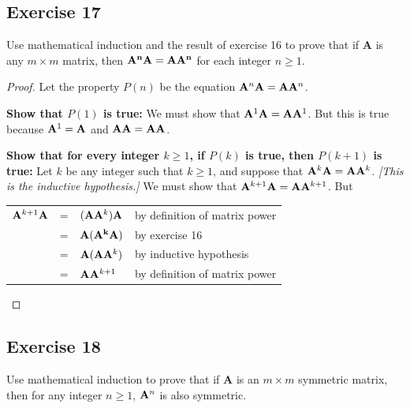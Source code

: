 \documentclass[14pt]{extarticle}
\newcommand{\cy}{\color{cyan}}
\begin{document}
\subsection{Exercise 17}
Use mathematical induction and the result of exercise 16 to prove that if {\bf A} is any \(m \times m\) matrix, then \({\bf A^n A = AA^n}\) for each integer \(n \geq 1\).

\begin{proof}
    Let the property \(P(n)\) be the equation \({\bf A}^n {\bf A} = {\bf A}{\bf A}^n\).

        {\bf Show that \(P(1)\) is true:} We must show that \({\bf A}^1{\bf A} = {\bf A}{\bf A}^1\). But this is true because
    \({\bf A}^1 = {\bf A}\) and \({\bf A}{\bf A} = {\bf A}{\bf A}\).

        {\bf Show that for every integer \(k \geq 1\), if \(P(k)\) is true, then \(P(k + 1)\) is true:} Let \(k\) be any integer
    such that \(k \geq 1\), and suppose that \({\bf A}^k{\bf A} = {\bf A}{\bf A}^k\). {\it [This is the inductive hypothesis.]}
    We must show that \({\bf A}^{k+1}{\bf A} = {\bf A}{\bf A}^{k+1}\). But
    \begin{center}
        \begin{tabular}{rcll}
            \({\bf A}^{k+1}{\bf A}\) & = & \(({\bf A}{\bf A}^k){\bf A}\) & {\cy by definition of matrix power} \\
                                     & = & \({\bf A}({\bf A^k}{\bf A})\) & {\cy by exercise 16}                \\
                                     & = & \({\bf A}({\bf A}{\bf A}^k)\) & {\cy by inductive hypothesis}       \\
                                     & = & \({\bf A}{\bf A}^{k+1}\)      & {\cy by definition of matrix power} \\
        \end{tabular}
    \end{center}
\end{proof}

\subsection{Exercise 18}
Use mathematical induction to prove that if {\bf A} is an \(m \times m\) symmetric matrix, then for any integer
\(n \geq 1\), \({\bf A}^n\) is also symmetric.
\end{document}

